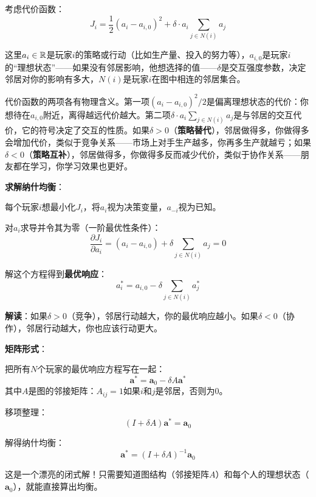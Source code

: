 \begin{example}
\label{ex:lq_network}
考虑代价函数：
\begin{equation}
    J_i = \frac{1}{2}(a_i - a_{i,0})^2 + \delta \cdot a_i \sum_{j \in N(i)} a_j
\end{equation}

这里$a_i \in \mathbb{R}$是玩家$i$的策略或行动（比如生产量、投入的努力等），$a_{i,0}$是玩家$i$的“理想状态”——如果没有邻居影响，他想选择的值——$\delta$是交互强度参数，决定邻居对你的影响有多大，$N(i)$是玩家$i$在图中相连的邻居集合。

代价函数的两项各有物理含义。第一项$(a_i - a_{i,0})^2/2$是偏离理想状态的代价：你想待在$a_{i,0}$附近，离得越远代价越大。第二项$\delta \cdot a_i \sum_{j \in N(i)} a_j$是与邻居的交互代价，它的符号决定了交互的性质。如果$\delta > 0$（\textbf{策略替代}），邻居做得多，你做得多会增加代价，类似于竞争关系——市场上对手生产越多，你再多生产就越亏；如果$\delta < 0$（\textbf{策略互补}），邻居做得多，你做得多反而减少代价，类似于协作关系——朋友都在学习，你学习效果也更好。

\textbf{求解纳什均衡}：

每个玩家$i$想最小化$J_i$，将$a_i$视为决策变量，$a_{-i}$视为已知。

对$a_i$求导并令其为零（一阶最优性条件）：
\begin{equation}
    \frac{\partial J_i}{\partial a_i} = (a_i - a_{i,0}) + \delta \sum_{j \in N(i)} a_j = 0
\end{equation}

解这个方程得到\textbf{最优响应}：
\begin{equation}
    a_i^* = a_{i,0} - \delta \sum_{j \in N(i)} a_j^*
\end{equation}

\textbf{解读}：如果$\delta > 0$（竞争），邻居行动越大，你的最优响应越小。如果$\delta < 0$（协作），邻居行动越大，你也应该行动更大。

\textbf{矩阵形式}：

把所有$N$个玩家的最优响应方程写在一起：
\begin{equation}
    \mathbf{a}^* = \mathbf{a}_0 - \delta A \mathbf{a}^*
\end{equation}
其中$A$是图的邻接矩阵：$A_{ij} = 1$如果$i$和$j$是邻居，否则为0。

移项整理：
\begin{equation}
    (I + \delta A) \mathbf{a}^* = \mathbf{a}_0
\end{equation}

解得纳什均衡：
\begin{equation}
    \boxed{\mathbf{a}^* = (I + \delta A)^{-1} \mathbf{a}_0}
\end{equation}

这是一个漂亮的闭式解！只需要知道图结构（邻接矩阵$A$）和每个人的理想状态（$\mathbf{a}_0$），就能直接算出均衡。
\end{example}

